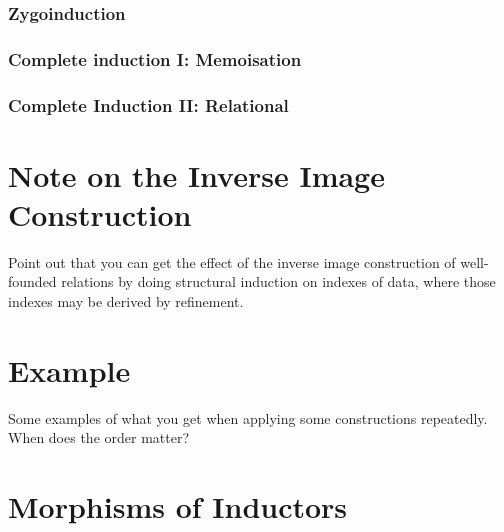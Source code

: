 \documentclass{amsart}
\begin{document}


\subsubsection{Zygoinduction}

\subsubsection{Complete induction I: Memoisation}

\subsubsection{Complete Induction II: Relational}

\section{Note on the Inverse Image Construction}

Point out that you can get the effect of the inverse image
construction of well-founded relations by doing structural induction
on indexes of data, where those indexes may be derived by refinement.

\section{Example}

Some examples of what you get when applying some constructions
repeatedly. When does the order matter?

\section{Morphisms of Inductors}
\end{document}

